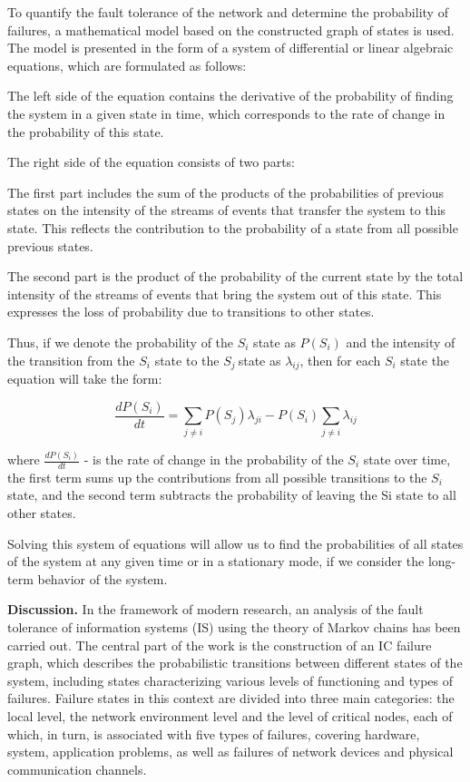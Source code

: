 To quantify the fault tolerance of the network and determine the
probability of failures, a mathematical model based on the constructed
graph of states is used. The model is presented in the form of a system
of differential or linear algebraic equations, which are formulated as
follows:

The left side of the equation contains the derivative of the probability
of finding the system in a given state in time, which corresponds to the
rate of change in the probability of this state.

The right side of the equation consists of two parts:

The first part includes the sum of the products of the probabilities of
previous states on the intensity of the streams of events that transfer
the system to this state. This reflects the contribution to the
probability of a state from all possible previous states.

The second part is the product of the probability of the current state
by the total intensity of the streams of events that bring the system
out of this state. This expresses the loss of probability due to
transitions to other states.

Thus, if we denote the probability of the \(S_{i}\) state as
\(P(S_{i})\) and the intensity of the transition from the \(S_{i}\)
state to the \(S_{j}\ \)state as \(\lambda_{ij}\), then for each
\(S_{i}\) state the equation will take the form:

\[\frac{dP(S_{i})}{dt} = \sum_{j \neq i}^{}{P(S_{j})}\lambda_{ji} - P(S_{i})\sum_{j \neq i}^{}\lambda_{ij}\]

where \(\frac{dP(S_{i})}{dt}\) - is the rate of change in the
probability of the \(S_{i}\) state over time, the first term sums up the
contributions from all possible transitions to the \(S_{i}\) state, and
the second term subtracts the probability of leaving the Si state to all
other states.

Solving this system of equations will allow us to find the probabilities
of all states of the system at any given time or in a stationary mode,
if we consider the long-term behavior of the system.

\textbf{Discussion.} In the framework of modern research, an analysis of
the fault tolerance of information systems (IS) using the theory of
Markov chains has been carried out. The central part of the work is the
construction of an IC failure graph, which describes the probabilistic
transitions between different states of the system, including states
characterizing various levels of functioning and types of failures.
Failure states in this context are divided into three main categories:
the local level, the network environment level and the level of critical
nodes, each of which, in turn, is associated with five types of
failures, covering hardware, system, application problems, as well as
failures of network devices and physical communication channels.

